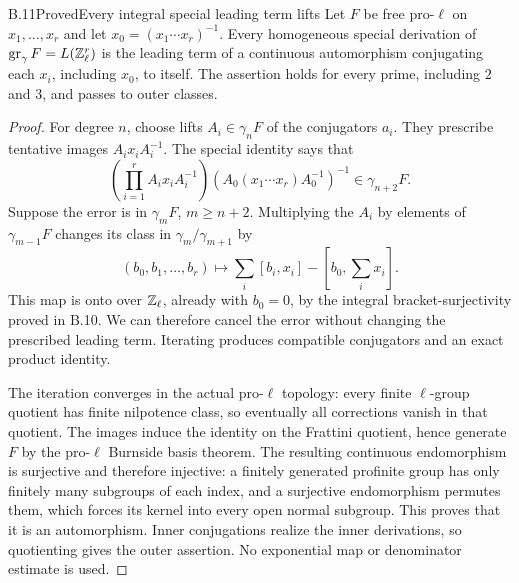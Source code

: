 \begin{statement}{B.11}{Proved}{Every integral special leading term lifts}
Let $F$ be free pro-$\ell$ on $x_1,\ldots,x_r$ and let
$x_0=(x_1\cdots x_r)^{-1}$. Every homogeneous special
derivation of $\operatorname{gr}_\gamma F=L(\mathbb Z_\ell^r)$ is the leading
term of a continuous automorphism conjugating each $x_i$,
including $x_0$, to itself. The assertion holds for every
prime, including $2$ and $3$, and passes to outer classes.
\end{statement}
\begin{proof}
For degree $n$, choose lifts $A_i\in\gamma_nF$ of the
conjugators $a_i$. They prescribe tentative images
$A_i x_i A_i^{-1}$. The special identity says that
\[
 \left(\prod_{i=1}^r A_i x_i A_i^{-1}\right)
      \left(A_0(x_1\cdots x_r)A_0^{-1}\right)^{-1}
       \in\gamma_{n+2}F .
\]
Suppose the error is in $\gamma_mF$, $m\ge n+2$.
Multiplying the $A_i$ by elements of $\gamma_{m-1}F$
changes its class in $\gamma_m/\gamma_{m+1}$ by
\[
 (b_0,b_1,\ldots,b_r)\longmapsto
      \sum_i[b_i,x_i]-[b_0,\sum_i x_i].
\]
This map is onto over $\mathbb Z_\ell$, already with $b_0=0$,
by the integral bracket-surjectivity proved in B.10.
We can therefore cancel the error without changing the
prescribed leading term. Iterating produces compatible
conjugators and an exact product identity.

The iteration converges in the actual pro-$\ell$ topology:
every finite $\ell$-group quotient has finite nilpotence
class, so eventually all corrections vanish in that quotient.
The images induce the identity on the Frattini quotient,
hence generate $F$ by the pro-$\ell$ Burnside basis theorem.
The resulting continuous endomorphism is surjective and
therefore injective: a finitely generated profinite group
has only finitely many subgroups of each index, and a
surjective endomorphism permutes them, which forces its
kernel into every open normal subgroup. This proves that it
is an automorphism. Inner conjugations realize the inner
derivations, so quotienting gives the outer assertion.
No exponential map or denominator estimate is used.
\end{proof}

